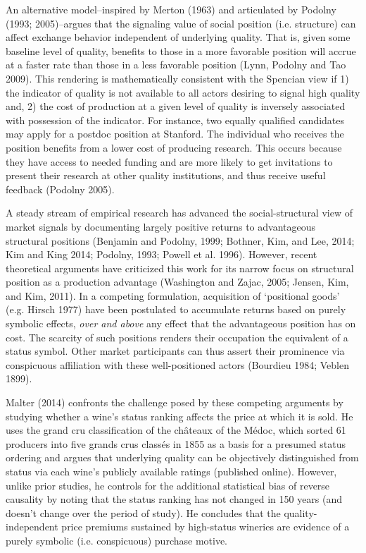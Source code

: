 An alternative model--inspired by Merton (1963) and articulated by Podolny (1993; 2005)--argues that the signaling value of social position (i.e. structure) can affect exchange behavior independent of underlying quality. That is, given some baseline level of quality, benefits to those in a more favorable position will accrue at a faster rate than those in a less favorable position (Lynn, Podolny and Tao 2009). This rendering is mathematically consistent with the Spencian view if 1) the indicator of quality is not available to all actors desiring to signal high quality and, 2) the cost of production at a given level of quality is inversely associated with possession of the indicator. For instance, two equally qualified candidates may apply for a postdoc position at Stanford. The individual who receives the position benefits from a lower cost of producing research. This occurs because they have access to needed funding and are more likely to get invitations to present their research at other quality institutions, and thus receive useful feedback (Podolny 2005).

A steady stream of empirical research has advanced the social-structural view of market signals by documenting largely positive returns to advantageous structural positions (Benjamin and Podolny, 1999; Bothner, Kim, and Lee, 2014; Kim and King 2014; Podolny, 1993; Powell et al. 1996). However, recent theoretical arguments have criticized this work for its narrow focus on structural position as a production advantage (Washington and Zajac, 2005; Jensen, Kim, and Kim, 2011). In a competing formulation, acquisition of `positional goods' (e.g. Hirsch 1977) have been postulated to accumulate returns based on purely symbolic effects, {\it over and above} any effect that the advantageous position has on cost. The scarcity of such positions renders their occupation the equivalent of a status symbol. Other market participants can thus assert their prominence via conspicuous affiliation with these well-positioned actors (Bourdieu 1984; Veblen 1899). 

Malter (2014) confronts the challenge posed by these competing arguments by studying whether a wine's status ranking affects the price at which it is sold. He uses the grand cru classification of the ch\^ateaux of the M\'edoc, which sorted 61 producers into five grands crus class\'es in 1855 as a basis for a presumed status ordering and argues that underlying quality can be objectively distinguished from status via each wine's publicly available ratings (published online). However, unlike prior studies, he controls for the additional statistical bias of reverse causality by noting that the status ranking has not changed in 150 years (and doesn't change over the period of study). He concludes that the quality-independent price premiums sustained by high-status wineries are evidence of a purely symbolic (i.e. conspicuous) purchase motive.

